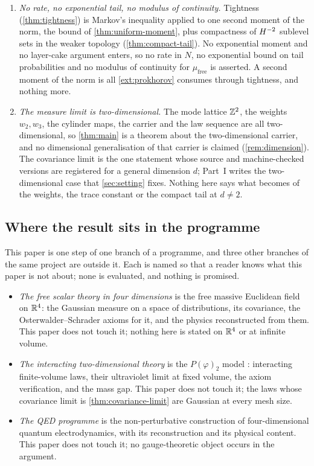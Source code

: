 \begin{enumerate}
\item \emph{No rate, no exponential tail, no modulus of continuity.}  Tightness
  (\cref{thm:tightness}) is Markov's inequality applied to one second moment of
  the norm, the bound of \cref{thm:uniform-moment}, plus compactness of
  $H^{-2}$ sublevel
  sets in the weaker topology (\cref{thm:compact-tail}).  No exponential moment
  and no layer-cake argument enters, so no rate in $N$, no exponential bound on
  tail probabilities and no modulus of continuity for $\mu_{\mathrm{free}}$ is
  asserted.  A second moment of the norm is all \cref{ext:prokhorov} consumes
  through tightness, and nothing
  more.
\item \emph{The measure limit is two-dimensional.}  The mode lattice $\mathbb{Z}^2$, the
  weights $w_2,w_3$, the cylinder maps, the carrier and the law sequence are all
  two-dimensional, so \cref{thm:main} is a theorem about the two-dimensional
  carrier, and no dimensional generalisation of that carrier is claimed
  (\cref{rem:dimension}).  The covariance limit is the one statement whose
  source and machine-checked versions are registered for a general dimension
  $d$; Part~I writes the two-dimensional case that \cref{sec:setting} fixes.
  Nothing here says what becomes of the weights, the trace constant or the
  compact tail at $d\neq2$.
\end{enumerate}

\subsection{Where the result sits in the programme}

This paper is one step of one branch of a programme, and three other branches of
the same project are outside it.  Each is named so that a reader knows what this
paper is not about; none is evaluated, and nothing is promised.

\begin{itemize}
\item \emph{The free scalar theory in four dimensions} is the free massive
  Euclidean field on $\mathbb{R}^4$: the Gaussian measure on a space of distributions,
  its covariance, the Osterwalder--Schrader axioms for it, and the physics
  reconstructed from them.  This paper does not touch it; nothing here is stated
  on $\mathbb{R}^4$ or at infinite volume.
\item \emph{The interacting two-dimensional theory} is the $P(\varphi)_2$ model
  \cite{gjs1974}: interacting finite-volume laws, their ultraviolet limit at
  fixed volume, the axiom verification, and the mass gap.  This paper does not
  touch it; the laws whose covariance limit is \cref{thm:covariance-limit} are
  Gaussian at every mesh size.
\item \emph{The QED programme} is the non-perturbative construction of
  four-dimensional quantum electrodynamics, with its reconstruction and its
  physical content.  This paper does not touch it; no gauge-theoretic object
  occurs in the argument.
\end{itemize}

